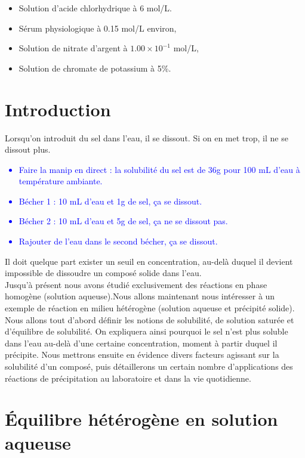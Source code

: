 \documentclass[11pt,a4paper]{report}
\begin{document}
\begin{itemize}
\begin{itemize}
		\item Solution d'acide chlorhydrique à 6 mol/L.\\
		
		\item Sérum physiologique à 0.15 mol/L environ,
		\item Solution de nitrate d'argent à $1.00\times10^{-1}$ mol/L,
		\item Solution de chromate de potassium à 5\%.\\
	\end{itemize} 
\end{itemize}

\newpage
\section*{Introduction}

Lorsqu'on introduit du sel dans l'eau, il se dissout. Si on en met trop, il ne se dissout plus.
\textcolor{blue}{
\begin{itemize}
	\item Faire la manip en direct : la solubilité du sel est de 36g pour 100 mL d'eau  à 				température ambiante.
	\item Bécher 1 : 10 mL d'eau et 1g de sel, ça se dissout.
	\item Bécher 2 : 10 mL d'eau et 5g de sel, ça ne se dissout pas.
	\item Rajouter de l'eau dans le second bécher, ça se dissout.\\
\end{itemize}}
Il doit quelque part exister un seuil en concentration, au-delà duquel il devient impossible de dissoudre un composé solide dans l'eau.\\ 

Jusqu'à présent nous avons étudié exclusivement des réactions en phase homogène (solution aqueuse).Nous allons maintenant nous intéresser à un exemple de réaction en milieu hétérogène (solution aqueuse et précipité solide). Nous allons tout d'abord définir les notions de solubilité, de solution saturée et d'équilibre de solubilité. On expliquera ainsi pourquoi le sel n'est plus soluble dans l'eau au-delà d'une certaine concentration, moment à partir duquel il précipite. Nous mettrons ensuite en évidence divers facteurs agissant sur la solubilité d'un composé, puis détaillerons un certain nombre d'applications des réactions de précipitation au laboratoire et dans la vie quotidienne.

\newpage
\section{Équilibre hétérogène en solution aqueuse}\label{sec:1}
\end{document}
